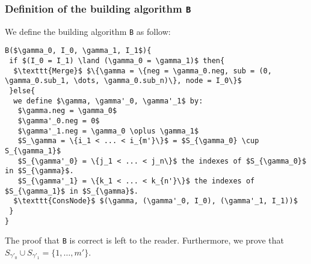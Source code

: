 \documentclass[a4paper,10pt]{article}
\begin{document}
\subsubsection{Definition of the building algorithm \texttt{B}}
We define the building algorithm \texttt{B} as follow: 
\begin{lstlisting}
B($\gamma_0, I_0, \gamma_1, I_1$){
 if $(I_0 = I_1) \land (\gamma_0 = \gamma_1)$ then{
  $\texttt{Merge}$ $\{\gamma = \{neg = \gamma_0.neg, sub = (0, \gamma_0.sub_1, \dots, \gamma_0.sub_n)\}, node = I_0\}$
 }else{
  we define $\gamma, \gamma'_0, \gamma'_1$ by: 
   $\gamma.neg = \gamma_0$
   $\gamma'_0.neg = 0$
   $\gamma'_1.neg = \gamma_0 \oplus \gamma_1$
   $S_\gamma = \{i_1 < ... < i_{m'}\}$ = $S_{\gamma_0} \cup S_{\gamma_1}$
   $S_{\gamma'_0} = \{j_1 < ... < j_n\}$ the indexes of $S_{\gamma_0}$ in $S_{\gamma}$.
   $S_{\gamma'_1} = \{k_1 < ... < k_{n'}\}$ the indexes of $S_{\gamma_1}$ in $S_{\gamma}$.
  $\texttt{ConsNode}$ $(\gamma, (\gamma'_0, I_0), (\gamma'_1, I_1))$
 }
} 
\end{lstlisting}
The proof that \texttt{B} is correct is left to the reader.
Furthermore, we prove that $S_{\gamma'_0}\cup S_{\gamma'_1} = \{1, \dots, m'\}$.
\end{document}
